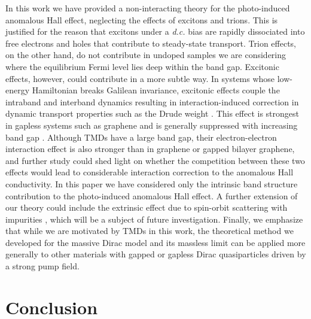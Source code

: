 \documentclass[reprint,amsmath,amssymb,aps,prb]{revtex4-1}
\begin{document}
In this work we have provided a non-interacting theory for the photo-induced anomalous Hall effect, neglecting the effects of excitons and trions. This is justified for the reason that 
excitons under a \textit{d.c.} bias are rapidly dissociated into free electrons and holes \cite{Exciton_1,ubrig2017microscopic} that contribute to steady-state transport. 
Trion effects, on the other hand, do not contribute in undoped samples we are considering where the equilibrium Fermi level lies deep within the band gap. Excitonic effects, however, could contribute in a more subtle way. In systems whose low-energy Hamiltonian breaks Galilean invariance, excitonic effects couple the intraband and interband dynamics resulting in  interaction-induced correction in dynamic transport properties such as the Drude weight \cite{Excitonic1,Excitonic3}. This effect is strongest in gapless systems such as graphene and is generally suppressed with increasing band gap \cite{Excitonic2}. Although TMDs have a large band gap, their electron-electron interaction effect is also stronger than in graphene or gapped bilayer graphene, and further study could shed light on whether the competition between these two effects would lead to considerable interaction correction to the anomalous Hall conductivity. In this paper we have considered only the intrinsic band  structure  contribution to the photo-induced anomalous Hall effect. A further extension of our theory could include the extrinsic effect due to spin-orbit scattering with impurities \cite{AHE_RMP}, which will be a subject of future investigation. 
Finally, we emphasize that while we are motivated by TMDs in this work, the theoretical method we  developed for the massive Dirac model and its massless limit 
can be applied more generally to other materials with gapped or gapless Dirac quasiparticles  \cite{DM_Rev,WSM_Rev,TI_Rev}
driven by a strong pump field. 

\section{Conclusion} \label{sec:concl}
\end{document}
